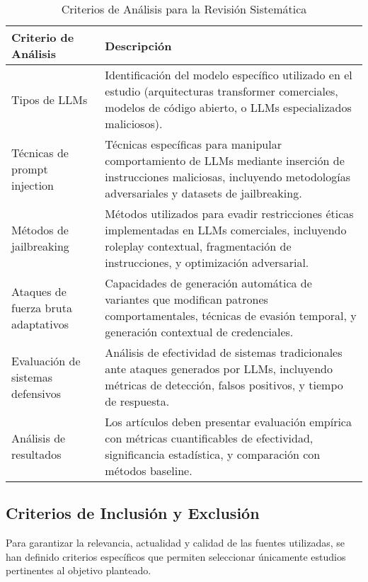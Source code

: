 \begin{table}[h]
\centering
\caption{Criterios de Análisis para la Revisión Sistemática}
\label{tab:criterios_analisis}
\begin{tabular}{|p{4cm}|p{8cm}|}
\hline
\textbf{Criterio de Análisis} & \textbf{Descripción} \\
\hline
Tipos de LLMs & Identificación del modelo específico utilizado en el estudio (arquitecturas transformer comerciales, modelos de código abierto, o LLMs especializados maliciosos). \\
\hline
Técnicas de prompt injection & Técnicas específicas para manipular comportamiento de LLMs mediante inserción de instrucciones maliciosas, incluyendo metodologías adversariales y datasets de jailbreaking. \\
\hline
Métodos de jailbreaking & Métodos utilizados para evadir restricciones éticas implementadas en LLMs comerciales, incluyendo roleplay contextual, fragmentación de instrucciones, y optimización adversarial. \\
\hline
Ataques de fuerza bruta adaptativos & Capacidades de generación automática de variantes que modifican patrones comportamentales, técnicas de evasión temporal, y generación contextual de credenciales. \\
\hline
Evaluación de sistemas defensivos & Análisis de efectividad de sistemas tradicionales ante ataques generados por LLMs, incluyendo métricas de detección, falsos positivos, y tiempo de respuesta. \\
\hline
Análisis de resultados & Los artículos deben presentar evaluación empírica con métricas cuantificables de efectividad, significancia estadística, y comparación con métodos baseline. \\
\hline
\end{tabular}
\end{table}

\subsection{Criterios de Inclusión y Exclusión}

Para garantizar la relevancia, actualidad y calidad de las fuentes utilizadas, se han definido criterios específicos que permiten seleccionar únicamente estudios pertinentes al objetivo planteado.

